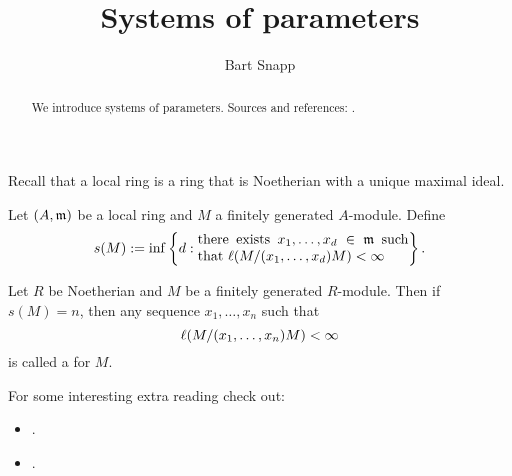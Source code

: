 \documentclass{ximera}
\author{Bart Snapp}
\title{Systems of parameters}
\begin{document}
\begin{abstract}
  We introduce systems of parameters. Sources and references:
  \cite{sD2008}.
\end{abstract}
\maketitle


Recall that a local ring is a ring that is Noetherian with a unique maximal ideal.

\begin{definition}
  Let $(A,\mathfrak{m})$ be a local ring and $M$ a finitely generated
  $A$-module. Define
  \[
  s(M) := \inf\left\{d:
  \begin{minipage}{35ex}
    there exists $x_1,\dots, x_d\in \m$ such that $\l(M/(x_1,\dots,x_d)M)<\infty$
  \end{minipage} \right\}.
  \]
\end{definition}

\begin{definition}
  Let $R$ be Noetherian and $M$ be a finitely generated
  $R$-module. Then if $s(M) = n$, then any sequence $x_1,\dots, x_n$
  such that
  \[
  \l(M/(x_1,\dots,x_n)M)<\infty\index{finite length}
  \]
  is called a  for $M$. 
\end{definition}





For some interesting extra reading check out:
\begin{itemize}

\item {}.
\item {}.
\end{itemize}
\end{document}
